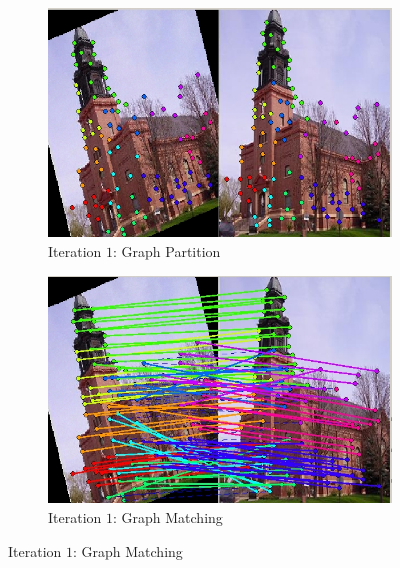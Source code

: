 \documentclass[
	fontsize=12pt,
	paper=a4,
	twoside=false,
	numbers=noenddot,
	plainheadsepline,
	toc=listof,
	toc=bibliography
]{scrartcl}
\begin{document}
	\begin{figure}[ht]
	\ContinuedFloat
	\begin{subfigure}[b]{0.5\textwidth}
		\centering
		\includegraphics[scale=0.35]{fig/method2/test_imagetrafo2/partition_it1.jpg} 
		\caption{Iteration $1$: Graph Partition} 
	\end{subfigure}%
	\begin{subfigure}[b]{0.5\textwidth}
		\centering
		\includegraphics[scale=0.35]{fig/method2/test_imagetrafo2/LL_it1.jpg} 
		\caption{Iteration $1$: Graph Matching} 
	\end{subfigure} 


\end{figure}
\end{document}
